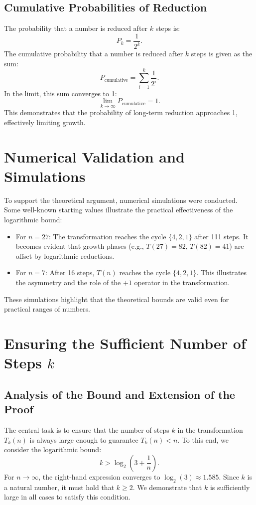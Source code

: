 \documentclass[a4paper,12pt]{article}
\begin{document}
\subsection{Cumulative Probabilities of Reduction}
The probability that a number is reduced after \( k \) steps is:
\[
P_k = \frac{1}{2^k}.
\]
The cumulative probability that a number is reduced after \( k \) steps is given as the sum:
\[
P_{\text{cumulative}} = \sum_{i=1}^k \frac{1}{2^i}.
\]
In the limit, this sum converges to 1:
\[
\lim_{k \to \infty} P_{\text{cumulative}} = 1.
\]
This demonstrates that the probability of long-term reduction approaches 1, effectively limiting growth.

\section{Numerical Validation and Simulations}
To support the theoretical argument, numerical simulations were conducted. Some well-known starting values illustrate the practical effectiveness of the logarithmic bound:

\begin{itemize}
    \item For \( n = 27 \): The transformation reaches the cycle \( \{4, 2, 1\} \) after 111 steps. It becomes evident that growth phases (e.g., \( T(27) = 82 \), \( T(82) = 41 \)) are offset by logarithmic reductions.
    \item For \( n = 7 \): After 16 steps, \( T(n) \) reaches the cycle \( \{4, 2, 1\} \). This illustrates the asymmetry and the role of the \(+1\) operator in the transformation.
\end{itemize}

These simulations highlight that the theoretical bounds are valid even for practical ranges of numbers.

\section{Ensuring the Sufficient Number of Steps \( k \)}

\subsection{Analysis of the Bound and Extension of the Proof}
The central task is to ensure that the number of steps \( k \) in the transformation \( T_k(n) \) is always large enough to guarantee \( T_k(n) < n \). To this end, we consider the logarithmic bound:
\[
k > \log_2\left(3 + \frac{1}{n}\right).
\]
For \( n \to \infty \), the right-hand expression converges to \( \log_2(3) \approx 1.585 \). Since \( k \) is a natural number, it must hold that \( k \geq 2 \). We demonstrate that \( k \) is sufficiently large in all cases to satisfy this condition.
\end{document}
